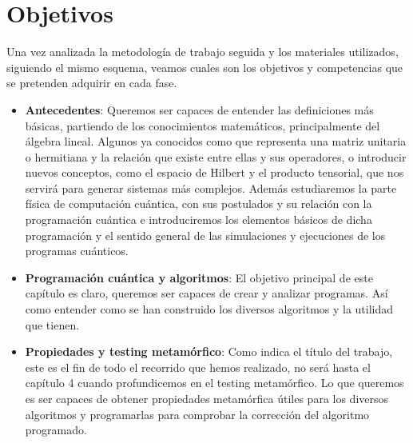 \section{Objetivos}

Una vez analizada la metodología de trabajo seguida y los materiales utilizados, siguiendo el mismo esquema, veamos cuales son los objetivos y competencias que se pretenden adquirir en cada fase.

\begin{itemize}
    \item \textbf{Antecedentes}: Queremos ser capaces de entender las definiciones más básicas, partiendo de los conocimientos matemáticos, principalmente del álgebra lineal. Algunos ya conocidos como que representa una matriz unitaria o hermitiana y la relación que existe entre ellas y sus operadores, o introducir nuevos conceptos, como el espacio de Hilbert y el producto tensorial, que nos servirá para generar sistemas más complejos. Además estudiaremos la parte física de computación cuántica, con sus postulados y su relación con la programación cuántica e introduciremos los elementos básicos de dicha programación y el sentido general de las simulaciones y ejecuciones de los programas cuánticos.
    
    \item \textbf{Programación cuántica y algoritmos}: El objetivo principal de este capítulo es claro, queremos ser capaces de crear y analizar programas. Así como entender como se han construido los diversos algoritmos y la utilidad que tienen.

    \item \textbf{Propiedades y testing metamórfico}: Como indica el título del trabajo, este es el fin de todo el recorrido que hemos realizado, no será hasta el capítulo 4 cuando profundicemos en el testing metamórfico. Lo que queremos es ser capaces de obtener propiedades metamórfica útiles para los diversos algoritmos y programarlas para comprobar la corrección del algoritmo programado.
\end{itemize}

\vspace{1cm}